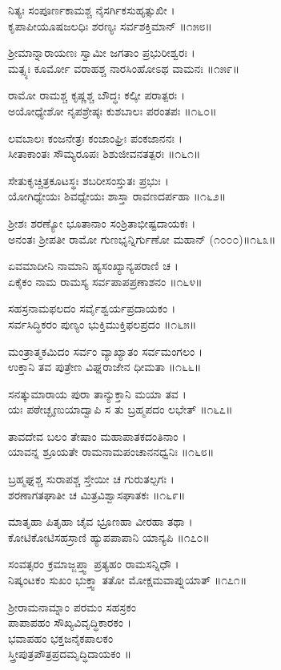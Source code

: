 ನಿತ್ಯಃ ಸಂಪೂರ್ಣಕಾಮಶ್ಚ ನೈಸರ್ಗಿಕಸುಹೃತ್ಸುಖೀ ।\\
ಕೃಪಾಪೀಯೂಷಜಲಧಿಃ ಶರಣ್ಯಃ ಸರ್ವಶಕ್ತಿಮಾನ್ ॥೧೫೮॥

ಶ್ರೀಮಾನ್ನಾರಾಯಣಃ ಸ್ವಾಮೀ ಜಗತಾಂ ಪ್ರಭುರೀಶ್ವರಃ ।\\
ಮತ್ಸ್ಯಃ ಕೂರ್ಮೋ ವರಾಹಶ್ಚ ನಾರಸಿಂಹೋಽಥ ವಾಮನಃ ॥೧೫೯॥

ರಾಮೋ ರಾಮಶ್ಚ ಕೃಷ್ಣಶ್ಚ ಬೌದ್ಧಃ ಕಲ್ಕೀ ಪರಾತ್ಪರಃ ।\\
ಅಯೋಧ್ಯೇಶೋ ನೃಪಶ್ರೇಷ್ಠಃ ಕುಶಬಾಲಃ ಪರಂತಪಃ ॥೧೬೦॥

ಲವಬಾಲಃ ಕಂಜನೇತ್ರಃ ಕಂಜಾಂಘ್ರಿಃ ಪಂಕಜಾನನಃ ।\\
ಸೀತಾಕಾಂತಃ ಸೌಮ್ಯರೂಪಃ ಶಿಶುಜೀವನತತ್ಪರಃ ॥೧೬೧॥

ಸೇತುಕೃಚ್ಚಿತ್ರಕೂಟಸ್ಥಃ ಶಬರೀಸಂಸ್ತುತಃ ಪ್ರಭುಃ ।\\
ಯೋಗಿಧ್ಯೇಯಃ ಶಿವಧ್ಯೇಯಃ ಶಾಸ್ತಾ ರಾವಣದರ್ಪಹಾ ॥೧೬೨॥

ಶ್ರೀಶಃ ಶರಣ್ಯೋ ಭೂತಾನಾಂ ಸಂಶ್ರಿತಾಭೀಷ್ಟದಾಯಕಃ ।\\
ಅನಂತಃ ಶ್ರೀಪತೀ ರಾಮೋ ಗುಣಭೃನ್ನಿರ್ಗುಣೋ ಮಹಾನ್ (೧೦೦೦)॥೧೬೩॥

ಏವಮಾದೀನಿ ನಾಮಾನಿ ಹ್ಯಸಂಖ್ಯಾನ್ಯಪರಾಣಿ ಚ ।\\
ಏಕೈಕಂ ನಾಮ ರಾಮಸ್ಯ ಸರ್ವಪಾಪಪ್ರಣಾಶನಂ ॥೧೬೪॥

ಸಹಸ್ರನಾಮಫಲದಂ ಸರ್ವೈಶ್ವರ್ಯಪ್ರದಾಯಕಂ ।\\
ಸರ್ವಸಿದ್ಧಿಕರಂ ಪುಣ್ಯಂ ಭುಕ್ತಿಮುಕ್ತಿಫಲಪ್ರದಂ ॥೧೬೫॥

ಮಂತ್ರಾತ್ಮಕಮಿದಂ ಸರ್ವಂ ವ್ಯಾಖ್ಯಾತಂ ಸರ್ವಮಂಗಲಂ ।\\
ಉಕ್ತಾನಿ ತವ ಪುತ್ರೇಣ ವಿಘ್ನರಾಜೇನ ಧೀಮತಾ ॥೧೬೬॥

ಸನತ್ಕುಮಾರಾಯ ಪುರಾ ತಾನ್ಯುಕ್ತಾನಿ ಮಯಾ ತವ ।\\
ಯಃ ಪಠೇಚ್ಛೃಣುಯಾದ್ವಾಪಿ ಸ ತು ಬ್ರಹ್ಮಪದಂ ಲಭೇತ್ ॥೧೬೭॥

ತಾವದೇವ ಬಲಂ ತೇಷಾಂ ಮಹಾಪಾತಕದಂತಿನಾಂ ।\\
ಯಾವನ್ನ ಶ್ರೂಯತೇ ರಾಮನಾಮಪಂಚಾನನಧ್ವನಿಃ ॥೧೬೮॥

ಬ್ರಹ್ಮಘ್ನಶ್ಚ ಸುರಾಪಶ್ಚ ಸ್ತೇಯೀ ಚ ಗುರುತಲ್ಪಗಃ ।\\
ಶರಣಾಗತಘಾತೀ ಚ ಮಿತ್ರವಿಶ್ವಾಸಘಾತಕಃ ॥೧೬೯॥

ಮಾತೃಹಾ ಪಿತೃಹಾ ಚೈವ ಭ್ರೂಣಹಾ ವೀರಹಾ ತಥಾ ।\\
ಕೋಟಿಕೋಟಿಸಹಸ್ರಾಣಿ ಹ್ಯುಪಪಾಪಾನಿ ಯಾನ್ಯಪಿ ॥೧೭೦॥

ಸಂವತ್ಸರಂ ಕ್ರಮಾಜ್ಜಪ್ತ್ವಾ ಪ್ರತ್ಯಹಂ ರಾಮಸನ್ನಿಧೌ ।\\
ನಿಷ್ಕಂಟಕಂ ಸುಖಂ ಭುಕ್ತ್ವಾ ತತೋ ಮೋಕ್ಷಮವಾಪ್ನುಯಾತ್ ॥೧೭೧॥

ಶ್ರೀರಾಮನಾಮ್ನಾಂ ಪರಮಂ ಸಹಸ್ರಕಂ\\ ಪಾಪಾಪಹಂ ಸೌಖ್ಯವಿವೃದ್ಧಿಕಾರಕಂ ।\\
ಭವಾಪಹಂ ಭಕ್ತಜನೈಕಪಾಲಕಂ \\ಸ್ತ್ರೀಪುತ್ರಪೌತ್ರಪ್ರದಮೃದ್ಧಿದಾಯಕಂ ॥

